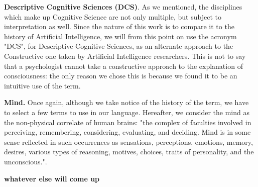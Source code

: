 \documentclass[../main.tex]{subfiles}
\begin{document}
\vspace{5pt}
\textbf{Descriptive Cognitive Sciences (DCS)}. As we mentioned, the disciplines which make up Cognitive Science are not only multiple, but subject to interpretation as well. Since the nature of this work is to compare it to the history of Artificial Intelligence, we will from this point on use the acronym "DCS", for Descriptive Cognitive Sciences, as an alternate approach to the Constructive one taken by Artificial Intelligence researchers. This is not to say that a psychologist cannot take a constructive approach to the explanation of consciousness: the only reason we chose this is because we found it to be an intuitive use of the term.

\vspace{5pt}
\textbf{Mind.} Once again, although we take notice of the history of the term, we have to select a few terms to use in our language. Hereafter, we consider the mind as the non-physical correlate of human brains: "the complex of faculties involved in perceiving, remembering, considering, evaluating, and deciding. Mind is in some sense reflected in such occurrences as sensations, perceptions, emotions, memory, desires, various types of reasoning, motives, choices, traits of personality, and the unconscious."\cite{Mind}.

\vspace{5pt}
\textbf{whatever else will come up}
\end{document}
